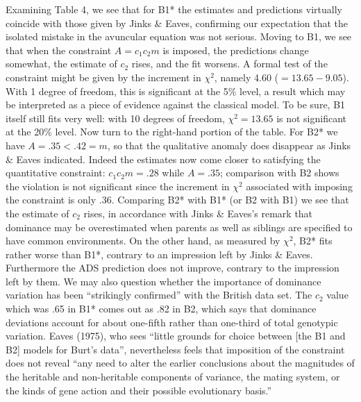﻿\documentclass[12pt]{article}
\begin{document}
Examining Table 4, we see that for B1* the estimates and predictions virtually coincide with those given by Jinks \& Eaves, confirming our expectation that the isolated mistake in the avuncular equation was not serious. Moving to B1, we see that when the constraint $A = c_1c_2m$ is imposed, the predictions change somewhat, the estimate of $c_2$ rises, and the fit worsens. A formal test of the constraint might be given by the increment in $\chi^2$, namely 4.60 ($=13.65-9.05$). With 1 degree of freedom, this is significant at the 5\% level, a result which may be interpreted as a piece of evidence against the classical model. To be sure, B1 itself still fits very well: with 10 degrees of freedom, $\chi^2 = 13.65$ is not significant at the 20\% level. Now turn to the right-hand portion of the table. For B2* we have $A=.35 < .42 = m$, so that the qualitative anomaly does disappear as Jinks \& Eaves indicated. Indeed the estimates now come closer to satisfying the quantitative constraint: $c_1c_2m = .28$ while $A=.35$; comparison with B2 shows the violation is not significant since the increment in $\chi^2$ associated with imposing the constraint is only .36. Comparing B2* with B1* (or B2 with B1) we see that the estimate of $c_2$ rises, in accordance with Jinks \& Eaves's remark that dominance may be overestimated when parents as well as siblings are specified to have common environments. On the other hand, as measured by $\chi^2$, B2* fits rather worse than B1*, contrary to an impression left by Jinks \& Eaves. Furthermore the ADS prediction does not improve, contrary to the impression left by them. We may also question whether the importance of dominance variation has been ``strikingly confirmed'' with the British data set. The $c_2$ value which was .65 in B1* comes out as .82 in B2, which says that dominance deviations account for about one-fifth rather than one-third of total genotypic variation. Eaves (1975), who sees ``little grounds for choice between [the B1 and B2] models for Burt's data'', nevertheless feels that imposition of the constraint does not reveal ``any need to alter the earlier conclusions about the magnitudes of the heritable and non-heritable components of variance, the mating system, or the kinds of gene action and their possible evolutionary basis.''
\end{document}
